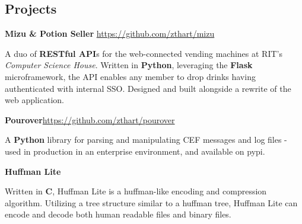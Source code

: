\documentclass[margin,line]{resume}
\newcommand{\rurl}[1]{\hfill {\footnotesize \url{#1}}}
\begin{document}
\begin{resume}
\section{\mysidestyle Projects}
	\begin{asparablank}
        \item {\bf Mizu \& Potion Seller } \rurl{https://github.com/zthart/mizu}

        \small A duo of \textbf{RESTful API}s for the web-connected vending machines at RIT's 
        \textit{Computer Science House}. Written in \textbf{Python}, leveraging the \textbf{Flask} microframework, 
        the API enables any member to drop drinks having authenticated with internal SSO. Designed and built 
        alongside a rewrite of the web application.
        \\
		\item {\bf Pourover}\rurl{https://github.com/zthart/pourover}

		\small A \textbf{Python} library for parsing and manipulating CEF messages and log files - used in production in 
        an enterprise environment, and available on pypi.
		\normalsize
		\\
		\item {\bf Huffman Lite}

		\small Written in \textbf{C}, Huffman Lite is a huffman-like encoding and compression algorithm. Utilizing a 
        tree structure similar to a huffman tree, Huffman Lite can encode and decode both human readable files and 
        binary files.
		\normalsize
	\end{asparablank}

% 


\end{resume}
\end{document}
